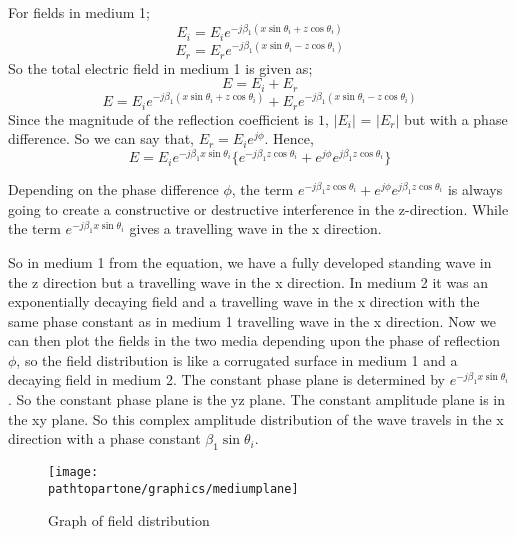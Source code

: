 For fields in medium 1;
\begin{equation}
E_i = E_i e^{- j \beta_1(x\sin\theta_i + z\cos\theta_i)}
\end{equation}
\begin{equation}
E_r = E_r e^{- j \beta_1(x\sin\theta_i - z\cos\theta_i)}
\end{equation}
So the total electric field in medium 1 is given as;
\begin{equation*}
E = E_i + E_r
\end{equation*}
\begin{equation*}
E =  E_i e^{- j \beta_1(x\sin\theta_i + z\cos\theta_i)} + E_r e^{- j \beta_1(x\sin\theta_i - z\cos\theta_i)}
\end{equation*}
Since the magnitude of the reflection coefficient is $1$,  $|E_{i}|$ = $|E_{r}|$ but with a phase difference. So we can say that, $E_{r} = E_{i}e^{j\phi}$.
Hence,
\begin{equation*}
E = E_i e^{- j \beta_1x\sin\theta_i}\{ e^{- j \beta_1z\cos\theta_i} + e^{j \phi}
e^{j \beta_1 z\cos\theta_i} \}
\end{equation*}

Depending on the phase difference $\phi$, the term $e^{- j \beta_1z\cos\theta_i} + e^{j \phi}
e^{j \beta_1 z\cos\theta_i}$ is always going to create a constructive or destructive interference in the z-direction. While the term $ e^{- j \beta_1x\sin\theta_i}$ gives a travelling wave in the x direction.

So in medium 1 from the equation, we have a fully developed standing wave in the z direction but a travelling wave in the x direction. In medium 2 it was an exponentially decaying field and a travelling wave in the x direction with the same phase constant as in medium 1 travelling wave in the x direction. Now we can then plot the fields in the two media depending upon the phase of reflection $\phi$, so the field distribution is like a corrugated surface in medium 1 and a decaying field in medium 2. The constant phase plane is determined by $e^{- j \beta_{1}x\sin\theta_i}$. So the constant phase plane is the yz plane. The constant amplitude plane is in the xy plane. So this complex amplitude distribution of the wave travels in the x direction with a phase constant $\beta_1\sin\theta_i$.
\begin{figure}[h]
\centering
\texttt{[image: \\pathtopartone/graphics/mediumplane]}
\caption{Graph of field distribution}
\label{fig:mediumplane}
\end{figure}

